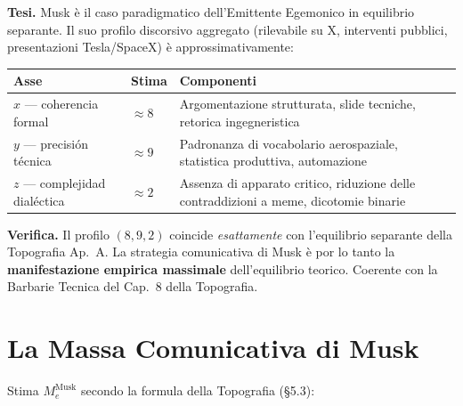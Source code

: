 \Hypoth{} \textbf{Tesi.} Musk è il caso paradigmatico dell'Emittente
Egemonico in equilibrio separante. Il suo profilo discorsivo aggregato
(rilevabile su X, interventi pubblici, presentazioni Tesla/SpaceX) è
approssimativamente:

{\def\LTcaptype{none} %
{\small\begin{longtable}[]{@{}
  >{\raggedright\arraybackslash}p{}
  >{\raggedright\arraybackslash}p{}
  >{\raggedright\arraybackslash}p{}@{}}
\toprule\noalign{}
\begin{minipage}[b]{\linewidth}\raggedright
Asse
\end{minipage} & \begin{minipage}[b]{\linewidth}\raggedright
Stima
\end{minipage} & \begin{minipage}[b]{\linewidth}\raggedright
Componenti
\end{minipage} \\
\midrule\noalign{}
\endhead
\bottomrule\noalign{}
\endlastfoot
\(x\) --- coherencia formal & \(\approx 8\) & Argomentazione strutturata,
slide tecniche, retorica ingegneristica \\
\(y\) --- precisión técnica & \(\approx 9\) & Padronanza di vocabolario
aerospaziale, statistica produttiva, automazione \\
\(z\) --- complejidad dialéctica & \(\approx 2\) & Assenza di apparato
critico, riduzione delle contraddizioni a meme, dicotomie binarie \\
\end{longtable}}
}

\Proved{} \textbf{Verifica.} Il profilo \((8, 9, 2)\) coincide
\emph{esattamente} con l'equilibrio separante della Topografia Ap.~A.
La strategia comunicativa di Musk è por lo tanto la \textbf{manifestazione
empirica massimale} dell'equilibrio teorico. Coerente con la Barbarie
Tecnica del Cap.~8 della Topografia.



\section{La Massa Comunicativa di
Musk}\label{la-massa-comunicativa-di-musk}

Stima \(M_e^{\text{Musk}}\) secondo la formula della Topografia (\S{}5.3):

